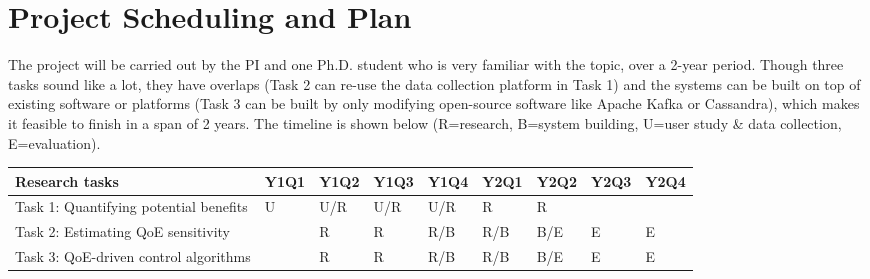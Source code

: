 \section{Project Scheduling and Plan}

The project will be carried out by the PI and one Ph.D. student who is very familiar with the topic, over a 2-year period.
Though three tasks sound like a lot, they have overlaps (\eg Task 2 can re-use the data collection platform in Task 1) and the systems can be built on top of existing software or platforms (\eg Task 3 can be built by only modifying open-source software like Apache Kafka or Cassandra), which makes it feasible to finish in a span of 2 years.
The timeline is shown below (R=research, B=system building, U=user study \& data collection, E=evaluation).
\begin{table}[h]
\footnotesize
\begin{tabular}{|l|l|l|l|l|l|l|l|l|}
\hline
Research tasks                           & Y1Q1 & Y1Q2 & Y1Q3 & Y1Q4 & Y2Q1 & Y2Q2 & Y2Q3 & Y2Q4 \\ \hline
Task 1: Quantifying potential benefits   & U    & U/R  & U/R  & U/R  &  R    &  R    &      &      \\ 
Task 2: Estimating QoE sensitivity &      & R    & R  & R/B  & R/B    & B/E    & E    & E    \\ 
Task 3: QoE-driven control algorithms    &    &   R    & R  & R/B  & R/B  & B/E  & E   &  E   \\ \hline
\end{tabular}
\end{table}






































